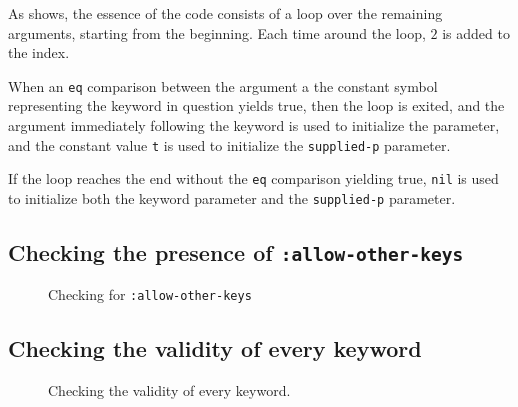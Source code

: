 As  shows, the essence of
the code consists of a loop over the remaining arguments, starting
from the beginning.  Each time around the loop, $2$ is added to the
index.

When an \texttt{eq} comparison between the argument a the constant
symbol representing the keyword in question yields true, then the loop
is exited, and the argument immediately following the keyword is used
to initialize the parameter, and the constant value \texttt{t} is used
to initialize the \texttt{supplied-p} parameter.

If the loop reaches the end without the \texttt{eq} comparison
yielding true, \texttt{nil} is used to initialize both the keyword
parameter and the \texttt{supplied-p} parameter.

\subsection{Checking the presence of \texttt{:allow-other-keys}}

\begin{figure}
\begin{center}
\end{center}
\caption{\label{fig-check-allow-other-keys}
Checking for \texttt{:allow-other-keys}}
\end{figure}

\subsection{Checking the validity of every keyword}

\begin{figure}
\begin{center}
\end{center}
\caption{\label{fig-check-every-keyword}
Checking the validity of every keyword.}
\end{figure}
